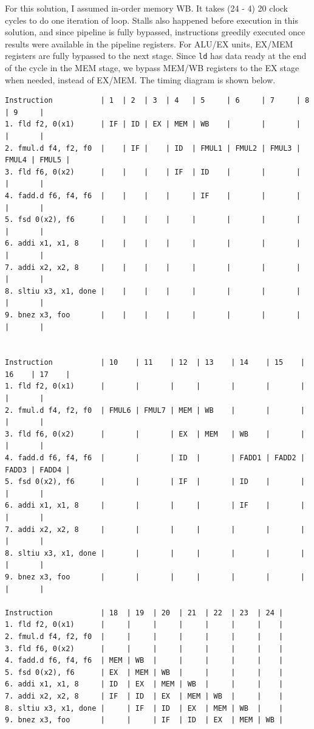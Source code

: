 \documentclass[11pt]{article}
\begin{document}
\begin{Answer}

For this solution, I assumed in-order memory WB. It takes (24 - 4) 20 clock cycles to do one iteration of loop. Stalls also happened before execution in this solution, and since pipeline is fully bypassed, instructions greedily executed once results were available in the pipeline registers. For ALU/EX units, EX/MEM registers are fully bypassed to the next stage. Since \verb|ld| has data ready at the end of the cycle in the MEM stage, we bypass MEM/WB registers to the EX stage when needed, instead of EX/MEM. The timing diagram is shown below.
\begin{verbatim}
Instruction           | 1  | 2  | 3  | 4   | 5     | 6     | 7     | 8     | 9     |
1. fld f2, 0(x1)      | IF | ID | EX | MEM | WB    |       |       |       |       |
2. fmul.d f4, f2, f0  |    | IF |    | ID  | FMUL1 | FMUL2 | FMUL3 | FMUL4 | FMUL5 |
3. fld f6, 0(x2)      |    |    |    | IF  | ID    |       |       |       |       |
4. fadd.d f6, f4, f6  |    |    |    |     | IF    |       |       |       |       |
5. fsd 0(x2), f6      |    |    |    |     |       |       |       |       |       |
6. addi x1, x1, 8     |    |    |    |     |       |       |       |       |       |
7. addi x2, x2, 8     |    |    |    |     |       |       |       |       |       |
8. sltiu x3, x1, done |    |    |    |     |       |       |       |       |       |
9. bnez x3, foo       |    |    |    |     |       |       |       |       |       |


Instruction           | 10    | 11    | 12  | 13    | 14    | 15    | 16    | 17    |
1. fld f2, 0(x1)      |       |       |     |       |       |       |       |       |
2. fmul.d f4, f2, f0  | FMUL6 | FMUL7 | MEM | WB    |       |       |       |       |
3. fld f6, 0(x2)      |       |       | EX  | MEM   | WB    |       |       |       |
4. fadd.d f6, f4, f6  |       |       | ID  |       | FADD1 | FADD2 | FADD3 | FADD4 |
5. fsd 0(x2), f6      |       |       | IF  |       | ID    |       |       |       |
6. addi x1, x1, 8     |       |       |     |       | IF    |       |       |       |
7. addi x2, x2, 8     |       |       |     |       |       |       |       |       |
8. sltiu x3, x1, done |       |       |     |       |       |       |       |       |
9. bnez x3, foo       |       |       |     |       |       |       |       |       |

Instruction           | 18  | 19  | 20  | 21  | 22  | 23  | 24 |
1. fld f2, 0(x1)      |     |     |     |     |     |     |    |
2. fmul.d f4, f2, f0  |     |     |     |     |     |     |    |
3. fld f6, 0(x2)      |     |     |     |     |     |     |    |
4. fadd.d f6, f4, f6  | MEM | WB  |     |     |     |     |    |
5. fsd 0(x2), f6      | EX  | MEM | WB  |     |     |     |    |
6. addi x1, x1, 8     | ID  | EX  | MEM | WB  |     |     |    |
7. addi x2, x2, 8     | IF  | ID  | EX  | MEM | WB  |     |    |
8. sltiu x3, x1, done |     | IF  | ID  | EX  | MEM | WB  |    |
9. bnez x3, foo       |     |     | IF  | ID  | EX  | MEM | WB |
\end{verbatim}

\end{Answer}
\newpage
\end{document}
